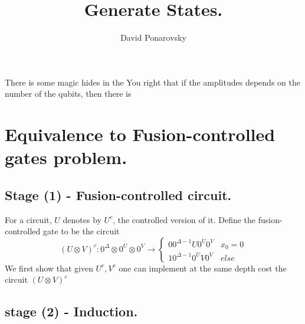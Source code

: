 \documentclass[manuscript,screen,review]{acmart}
\begin{document}


\title{Generate States.} 
\author{David Ponarovsky}

\ifdefined\ACM
\else
  \maketitle
\fi

\ifdefined\ACM
  \maketitle
\fi

% 

There is some magic hides in the You right that if the amplitudes depends on the number of the qubits, then there is  

\section{Equivalence to Fusion-controlled gates problem.}
\subsection{Stage (1) - Fusion-controlled circuit.}

For a circuit, $U$ denotes by $U^{c}$, the controlled version of it. Define the fusion-controlled gate to be the circuit $$(U\otimes V)^{c} :0^{\Delta}\otimes 0^{U}\otimes 0^{V}   \rightarrow \begin{cases} 0 0^{\Delta -1} U0^{U} 0^{V} & x_{0} = 0\\ 1 0^{\Delta -1} 0^{U} V0^{V} & else \end{cases} $$  We first show that given $U^{c},V^{c}$ one can implement at the same depth cost the circuit $(U\otimes V)^{c}$

\subsection{stage (2) - Induction.}
\end{document}

